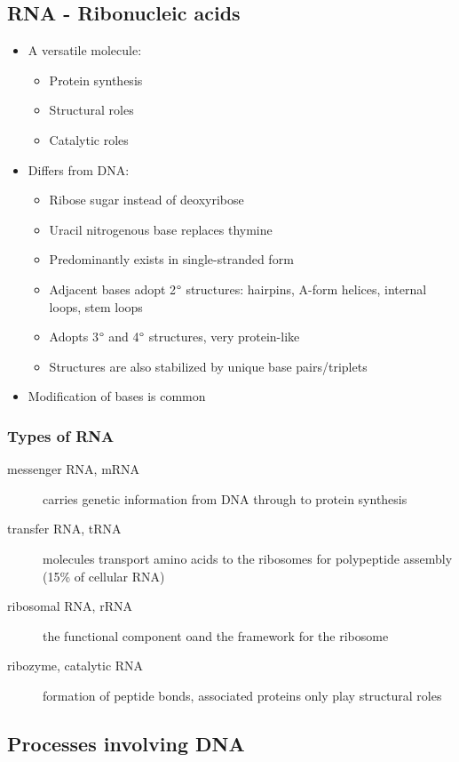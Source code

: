 \documentclass[letterpaper, 12pt]{article}
\begin{document}
\subsection*{RNA - Ribonucleic acids}
\begin{itemize}
\item A versatile molecule:
\begin{itemize}
\item Protein synthesis
\item Structural roles
\item Catalytic roles
\end{itemize}
\item Differs from DNA:
\begin{itemize}
\item Ribose sugar instead of deoxyribose
\item Uracil nitrogenous base replaces thymine
\item Predominantly exists in single-stranded form
\item Adjacent bases adopt 2$\degree$ structures: hairpins, A-form helices, internal loops, stem loops
\item Adopts 3$\degree$ and 4$\degree$ structures, very protein-like
\item Structures are also stabilized by unique base pairs/triplets
\end{itemize}
\item Modification of bases is common
\end{itemize}

\subsubsection*{Types of RNA}
\begin{description}
\item [messenger RNA, mRNA] carries genetic information from DNA through to protein synthesis
\item [transfer RNA, tRNA] molecules transport amino acids to the ribosomes for polypeptide assembly (15\% of cellular RNA)
\item [ribosomal RNA, rRNA] the functional component oand the framework for the ribosome
\item [ribozyme, catalytic RNA] formation of peptide bonds, associated proteins only play structural roles
\end{description}

\subsection*{Processes involving DNA}
\end{document}
